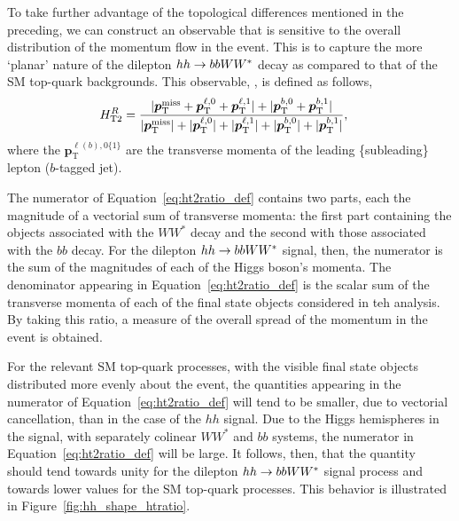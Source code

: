 %
%

To take further advantage of the topological differences mentioned in the preceding, we can construct
an observable that is sensitive to the overall distribution of the momentum flow in the event.
This is to capture the more `planar' nature of the dilepton $hh \rightarrow bbWW^*$ decay as compared
to that of the SM top-quark backgrounds.
This observable, \htratio, is defined as follows,
\begin{align}
    H_{\text{T2}}^{R} &= \frac{|\bm{p}_{\text{T}}^{\text{miss}} + \bm{p}_{\text{T}}^{\ell,0} + \bm{p}_{\text{T}}^{\ell,1}| + | \bm{p}_{\text{T}}^{b,0} + \bm{p}_{\text{T}}^{b,1}|}{|\bm{p}_{\text{T}}^{\text{miss}}| + |\bm{p}_{\text{T}}^{\ell,0}| + |\bm{p}_{\text{T}}^{\ell,1}| + |\bm{p}_{\text{T}}^{b,0}| + |\bm{p}_{\text{T}}^{b,1}|},
    \label{eq:ht2ratio_def}
\end{align}
where the $\bm{p}_{\text{T}}^{\ell(b),0 \{1\}}$ are the transverse momenta of the leading \{subleading\} lepton ($b$-tagged jet).

The numerator of Equation~\ref{eq:ht2ratio_def} contains two parts, each the magnitude of a vectorial sum of transverse
momenta: the first part containing the objects associated with the $WW^*$ decay and the second with those associated
with the $bb$ decay.
For the dilepton $hh \rightarrow bbWW^*$ signal, then, the numerator is the sum of the magnitudes of each of the Higgs boson's
momenta.
The denominator appearing in Equation~\ref{eq:ht2ratio_def} is the scalar sum of the transverse momenta of each of the
final state objects considered in teh analysis.
By taking this ratio, a measure of the overall spread of the momentum in the event is obtained.

For the relevant SM top-quark processes, with the visible final state objects distributed more evenly
about the event, the quantities appearing in the numerator of Equation~\ref{eq:ht2ratio_def} will
tend to be smaller, due to vectorial cancellation, than in the case of the $hh$ signal.
Due to the Higgs hemispheres in the signal, with separately colinear $WW^*$ and $bb$ systems,
the numerator in Equation~\ref{eq:ht2ratio_def} will be large.
It follows, then, that the quantity \htratio should tend towards unity for the dilepton $hh \rightarrow bbWW^*$
signal process and towards lower values for the SM top-quark processes.
This behavior is illustrated in Figure~\ref{fig:hh_shape_htratio}.


